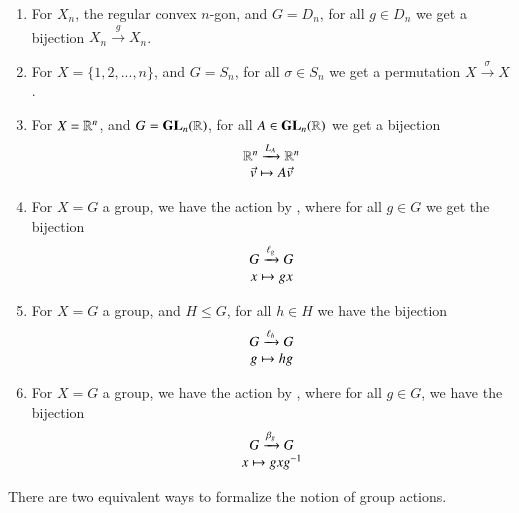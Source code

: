 \documentclass[12pt, a4paper, twoside, openright, titlepage]{book}
\begin{document}
\begin{eg}{}{}
        \leavevmode
        \begin{enumerate}
                \item For $X_n$, the regular convex $n$-gon, and $G = D_n$, for all $g \in D_n$ we get a bijection $X_n \xrightarrow{g} X_n$.
                \item For $X = \{1,2,...,n\}$, and $G = S_n$, for all $\sigma \in S_n$ we get a permutation $X \xrightarrow{\sigma} X$.
                \item For $X = \mathbb R^n$, and $G = \mathbf{GL}_n(\mathbb R)$, for all $A \in \mathbf{GL}_n(\mathbb R)$ we get a bijection \begin{equation}
                                \begin{array}{c} \mathbb R^n\xrightarrow{L_A}\mathbb R^n \\ \vec{v} \mapsto A\vec{v} \end{array}
                \end{equation}
                \item For $X = G$ a group, we have the action by , where for all $g \in G$ we get the bijection \begin{equation}
                                \begin{array}{c} G\xrightarrow{\ell_g}G \\ x\mapsto gx \end{array}
                \end{equation}
                \item For $X = G$ a group, and $H \leq G$, for all $h \in H$ we have the bijection \begin{equation}
                                \begin{array}{c} G \xrightarrow{\ell_h} G \\ g \mapsto hg \end{array}
                \end{equation}
                \item For $X = G$ a group, we have the action by , where for all $g \in G$, we have the bijection \begin{equation}
                                \begin{array}{c} G\xrightarrow{\beta_g}G \\ x\mapsto gxg^{-1} \end{array}
                \end{equation}
        \end{enumerate}
\end{eg}

\begin{rmk}{}{}
        There are two equivalent ways to formalize the notion of group actions.
\end{rmk}
\end{document}

